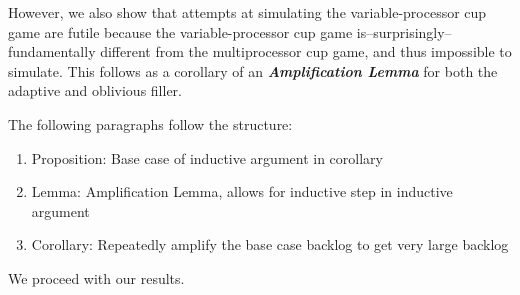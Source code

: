 \documentclass[twocolumn]{article}[11pt]
\newcommand{\defn}[1]{{\textit{\textbf{\boldmath #1}}}}
\begin{document}
However, we also show that attempts at simulating the variable-processor cup
game are futile because the variable-processor cup game
is--surprisingly--fundamentally different from the multiprocessor cup game, and
thus impossible to simulate. This follows as a corollary of an
\defn{Amplification Lemma} for both the adaptive and oblivious filler.

The following paragraphs follow the structure:
\begin{enumerate}
  \item Proposition: Base case of inductive argument in corollary
  \item Lemma: Amplification Lemma, allows for inductive step in inductive argument
  \item Corollary: Repeatedly amplify the base case backlog to get very large backlog
\end{enumerate}
We proceed with our results.
\end{document}
